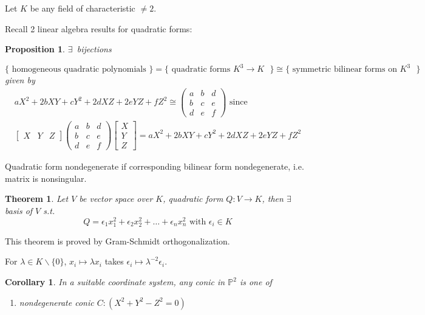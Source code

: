 \documentclass[10pt]{amsart}
\newtheorem{theorem}{Theorem}
\newtheorem{corollary}{Corollary}
\newtheorem{proposition}{Proposition}
\begin{document}
\begin{multicols*}{2}
Let $K$ be any field of characteristic $\neq 2$.

Recall 2 linear algebra results for quadratic forms:

\begin{proposition}
	$\exists \, $ bijections
	
	$\lbrace \text{ homogeneous quadratic polynomials } \rbrace = \lbrace \text{ quadratic forms $K^3 \to K$ } \rbrace \cong \lbrace \text{ symmetric bilinear forms on $K^3$ } \rbrace $
given by
\[
\begin{gathered} 
	aX^2 + 2bXY + cY^2 + 2dXZ + 2eYZ + fZ^2 \cong \left( \begin{matrix} a & b & d \\ b & c & e \\  d & e & f \end{matrix} \right) \text{ since } \\
	[ \begin{matrix} X & Y & Z \end{matrix} ] \left( \begin{matrix} a & b & d \\ b & c & e \\  d & e & f \end{matrix} \right) \left[ \begin{matrix} X \\ Y \\ Z \end{matrix} \right] = aX^2 + 2bXY + cY^2 + 2d XZ +2eYZ + fZ^2 
\end{gathered} 
\]
\end{proposition}
Quadratic form nondegenerate if corresponding bilinear form nondegenerate, i.e. matrix is nonsingular.

\begin{theorem}\label{Thm:DiagonalizedQuadraticForm}
Let $V$ be vector space over $K$, quadratic form $Q:V \to K$, then $\exists \, $ basis of $V$ s.t.
\begin{equation}
Q = \epsilon_1 x_1^2 + \epsilon_2 x_2^2 + \dots + \epsilon_n x_n^2 \text{ with } \epsilon_i \in K
\end{equation}
\end{theorem}
This theorem is proved by Gram-Schmidt orthogonalization.

For $\lambda \in K \backslash \lbrace 0 \rbrace$, $x_i \mapsto \lambda x_i$ takes $\epsilon_i \mapsto \lambda^{-2} \epsilon_i$.  

\begin{corollary}\label{Cor:ConicsClassification}
In a suitable coordinate system, any conic in $\mathbb{P}^2$ is one of 
\begin{enumerate}
\item[(a)] nondegenerate conic $C: (X^2 + Y^2- Z^2 =0)$
\end{enumerate}
\end{corollary}


\end{multicols*}
\end{document}
